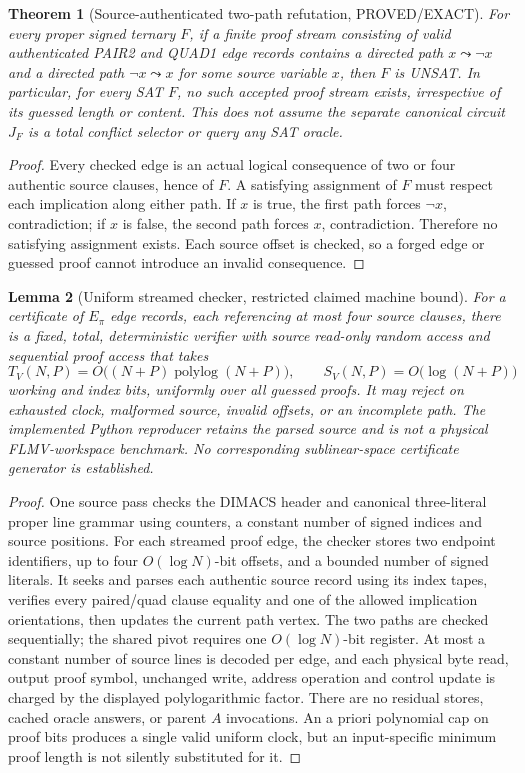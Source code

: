 \documentclass[11pt]{article}
\newtheorem{theorem}{Theorem}
\newtheorem{lemma}[theorem]{Lemma}
\begin{document}
\begin{theorem}[Source-authenticated two-path refutation, PROVED/EXACT]\label{th:proof}
For \emph{every} proper signed ternary $F$, if a finite proof stream consisting of valid authenticated PAIR2 and QUAD1 edge records contains a directed path $x\leadsto\neg x$ and a directed path $\neg x\leadsto x$ for some source variable $x$, then $F$ is UNSAT. In particular, for every SAT $F$, no such accepted proof stream exists, irrespective of its guessed length or content. This does not assume the separate canonical circuit $J_F$ is a total conflict selector or query any SAT oracle.
\end{theorem}
\begin{proof}
Every checked edge is an actual logical consequence of two or four authentic source clauses, hence of $F$. A satisfying assignment of $F$ must respect each implication along either path. If $x$ is true, the first path forces $\neg x$, contradiction; if $x$ is false, the second path forces $x$, contradiction. Therefore no satisfying assignment exists. Each source offset is checked, so a forged edge or guessed proof cannot introduce an invalid consequence.\end{proof}

\begin{lemma}[Uniform streamed checker, restricted claimed machine bound]\label{lem:resources}
For a certificate of $E_\pi$ edge records, each referencing at most four source clauses, there is a fixed, total, deterministic verifier with source read-only random access and sequential proof access that takes
\[
 T_V(N,P)=O\bigl((N+P)\operatorname{polylog}(N+P)\bigr),\qquad
 S_V(N,P)=O\bigl(\log(N+P)\bigr)
\]
working and index bits, uniformly over \emph{all guessed proofs}. It may reject on exhausted clock, malformed source, invalid offsets, or an incomplete path. The implemented Python reproducer retains the parsed source and is \emph{not} a physical FLMV-workspace benchmark. No corresponding sublinear-space \emph{certificate generator} is established.
\end{lemma}
\begin{proof}
One source pass checks the DIMACS header and canonical three-literal proper line grammar using counters, a constant number of signed indices and source positions. For each streamed proof edge, the checker stores two endpoint identifiers, up to four $O(\log N)$-bit offsets, and a bounded number of signed literals. It seeks and parses each authentic source record using its index tapes, verifies every paired/quad clause equality and one of the allowed implication orientations, then updates the current path vertex. The two paths are checked sequentially; the shared pivot requires one $O(\log N)$-bit register. At most a constant number of source lines is decoded per edge, and each physical byte read, output proof symbol, unchanged write, address operation and control update is charged by the displayed polylogarithmic factor. There are no residual stores, cached oracle answers, or parent $A$ invocations. An a priori polynomial cap on proof bits produces a single valid uniform clock, but an input-specific minimum proof length is not silently substituted for it.\end{proof}
\end{document}
